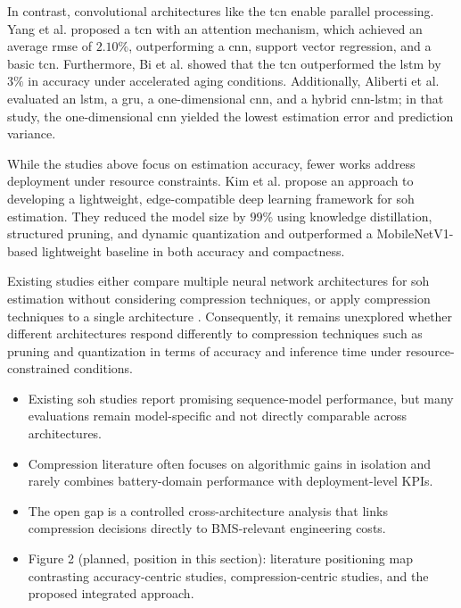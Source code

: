 \documentclass[final,3p,times]{elsarticle}
\begin{document}
In contrast, convolutional architectures like the \ac{tcn} enable parallel processing. Yang et al. \cite{yang_state_2024} proposed a \ac{tcn} with an attention mechanism, which achieved an average \ac{rmse} of $2.10\%$, outperforming a \ac{cnn}, support vector regression, and a basic \ac{tcn}. Furthermore, Bi et al. \cite{bi_performance_2022} showed that the \ac{tcn} outperformed the \ac{lstm} by $3\%$ in accuracy under accelerated aging conditions. Additionally, Aliberti et al. \cite{aliberti_comparative_2022} evaluated an \ac{lstm}, a \ac{gru}, a one-dimensional \ac{cnn}, and a hybrid \ac{cnn}-\ac{lstm}; in that study, the one-dimensional \ac{cnn} yielded the lowest estimation error and prediction variance.

While the studies above focus on estimation accuracy, fewer works address deployment under resource constraints. Kim et al. \cite{kim_edge-compatible_2025} propose an approach to developing a lightweight, edge-compatible deep learning framework for \ac{soh} estimation. They reduced the model size by $99\%$ using knowledge distillation, structured pruning, and dynamic quantization and outperformed a MobileNetV1-based lightweight baseline in both accuracy and compactness. 

Existing studies either compare multiple neural network architectures for \ac{soh} estimation without considering compression techniques, or apply compression techniques to a single architecture \cite{kim_edge-compatible_2025}. Consequently, it remains unexplored whether different architectures respond differently to compression techniques such as pruning and quantization in terms of accuracy and inference time under resource-constrained conditions.  

\begin{itemize}[leftmargin=*]

\item Existing \ac{soh} studies report promising sequence-model performance, but many evaluations remain model-specific and not directly comparable across architectures.
\item Compression literature often focuses on algorithmic gains in isolation and rarely combines battery-domain performance with deployment-level KPIs.
\item The open gap is a controlled cross-architecture analysis that links compression decisions directly to BMS-relevant engineering costs.
\item Figure 2 (planned, position in this section): literature positioning map contrasting accuracy-centric studies, compression-centric studies, and the proposed integrated approach.
\end{itemize}
\end{document}
